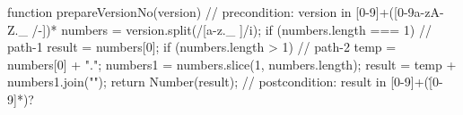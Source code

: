   function prepareVersionNo(version) {
    // precondition: version in [0-9]+([0-9a-zA-Z._ /-])*
    numbers = version.split(/[a-z._ \/\-]/i);
    if (numbers.length === 1) { // path-1
      result = numbers[0];     }
    if (numbers.length > 1) { // path-2
      temp = numbers[0] + ".";
      numbers1 = numbers.slice(1, numbers.length);
      result = temp + numbers1.join("");      }
    return Number(result);
    // postcondition: result in [0-9]+(\.[0-9]*)?
  }